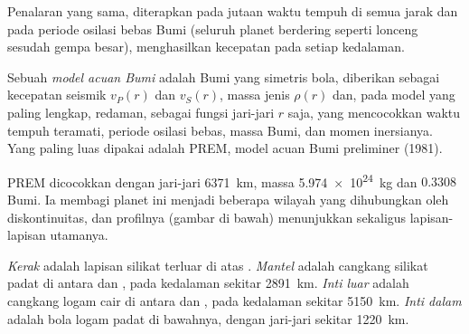 Penalaran yang sama, diterapkan pada jutaan waktu tempuh di semua jarak dan pada periode osilasi bebas Bumi (seluruh planet berdering seperti lonceng sesudah gempa besar), menghasilkan kecepatan pada setiap kedalaman.

\begin{definition}\label{def:b1:layered-earth:reference-model}
Sebuah \emph{model acuan Bumi} adalah Bumi yang simetris bola, diberikan sebagai kecepatan seismik $v_P(r)$ dan $v_S(r)$, massa jenis $\rho(r)$ dan, pada model yang paling lengkap, redaman, sebagai fungsi jari-jari $r$ saja, yang mencocokkan waktu tempuh teramati, periode osilasi bebas, massa Bumi, dan momen inersianya. Yang paling luas dipakai adalah PREM, model acuan Bumi preliminer (1981).
\end{definition}

PREM dicocokkan dengan jari-jari \qty{6371}{km}, massa \qty{5.974e24}{kg} dan  $0.3308$ Bumi. Ia membagi planet ini menjadi beberapa wilayah yang dihubungkan oleh diskontinuitas, dan profilnya (gambar di bawah) menunjukkan sekaligus lapisan-lapisan utamanya.

\begin{definition}\label{def:b1:layered-earth:layers}
\emph{Kerak} adalah lapisan silikat terluar di atas . \emph{Mantel} adalah cangkang silikat padat di antara  dan , pada kedalaman sekitar \qty{2891}{km}. \emph{Inti luar} adalah cangkang logam cair di antara  dan , pada kedalaman sekitar \qty{5150}{km}. \emph{Inti dalam} adalah bola logam padat di bawahnya, dengan jari-jari sekitar \qty{1220}{km}.
\end{definition}

